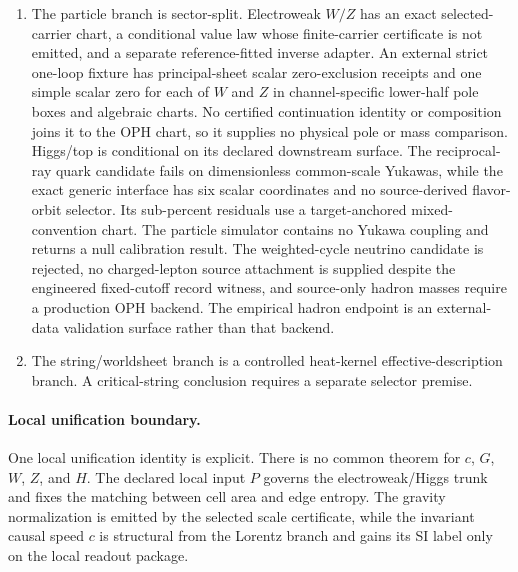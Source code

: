 \begin{enumerate}[leftmargin=2em]
reconstruct a compact group from sectors with strictifiable central or
higher-associator defects and at least one allowed trivial-holonomy strict
representative. That is a distinct conditional classification route. Physical
family identification and extra-sector exclusion require separate identifications.
No laboratory current identification, equality with the Tannaka current, or
physical matter-pole and continuum interpretation of the conditional
rank-\(45\) family candidate is supplied.
\item The particle branch is sector-split. Electroweak \(W/Z\) has an exact selected-carrier chart, a conditional value law whose finite-carrier certificate is not emitted, and a separate reference-fitted inverse adapter. An external strict one-loop fixture has principal-sheet scalar zero-exclusion receipts and one simple scalar zero for each of \(W\) and \(Z\) in channel-specific lower-half pole boxes and algebraic charts. No certified continuation identity or composition joins it to the OPH chart, so it supplies no physical pole or mass comparison. Higgs/top is conditional on its declared downstream surface. The reciprocal-ray quark candidate fails on dimensionless common-scale Yukawas, while the exact generic interface has six scalar coordinates and no source-derived flavor-orbit selector. Its sub-percent residuals use a target-anchored mixed-convention chart. The particle simulator contains no Yukawa coupling and returns a null calibration result. The weighted-cycle neutrino candidate is rejected, no charged-lepton source attachment is supplied despite the engineered fixed-cutoff record witness, and source-only hadron masses require a production OPH backend. The empirical hadron endpoint is an external-data validation surface rather than that backend.
\item The string/worldsheet branch is a controlled heat-kernel
effective-description branch. A critical-string conclusion requires a
separate selector premise.
\end{enumerate}

\paragraph{Local unification boundary.}
One local unification identity is explicit. There is no common theorem for
\(c\), \(G\), \(W\), \(Z\), and \(H\). The declared local input \(P\) governs the
electroweak/Higgs trunk and fixes the matching between cell area and edge entropy. The gravity
normalization is emitted by the selected scale certificate, while the invariant
causal speed \(c\) is structural from the Lorentz branch and gains its SI label only on the local
readout package.

